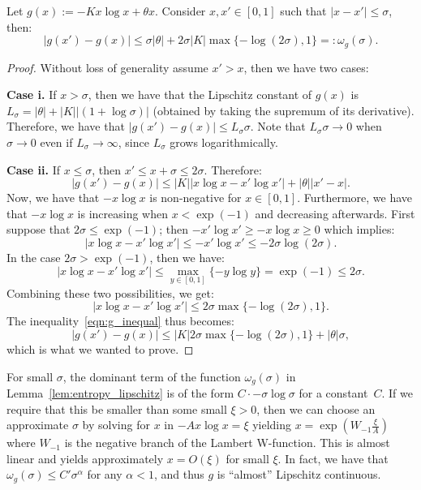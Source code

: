 \begin{lemma}
  \label{lem:entropy_lipschitz} Let $g(x) := -Kx\log x + \theta x$. Consider $x, x' \in [0,1]$ such that $|x-x'| \leq\sigma$, then:
  \begin{equation} \label{eqn:modulus_g}
  |g(x')-g(x)|\leq \sigma|\theta| + 2 \sigma |K| \max\{-\log(2\sigma),1\} =: \omega_g(\sigma).
  \end{equation}
\end{lemma}
\begin{proof}
	Without loss of generality assume $x'>x$, then we have two cases:

	\textbf{Case i.} 
	If $x>\sigma$, then we have that the Lipschitz constant of $g(x)$ is $L_{\sigma} = |\theta| + |K||(1+\log\sigma)|$ (obtained by taking 
	the supremum of its derivative). Therefore, we have that $|g(x')-g(x)|\leq L_{\sigma}\sigma$. Note that $L_\sigma\sigma\to 0$ when $\sigma\to 0$ even if
	$L_\sigma\to\infty$, since $L_\sigma$ grows logarithmically.

	\textbf{Case ii.}
	If $x\leq\sigma$, then $x'\leq x + \sigma \leq 2\sigma$. Therefore: 
	\begin{equation} \label{eqn:g_inequal}
	|g(x')-g(x)| \leq |K||x\log x-x'\log x'| + |\theta||x'-x|.
	\end{equation}
	Now, we have that $-x\log x$ is non-negative for $x\in [0,1]$. Furthermore, we have that 
	$-x\log x$ is increasing when $x<\exp(-1)$ and decreasing afterwards.
	First suppose that $2 \sigma \leq \exp(-1)$; then $-x'\log x' \geq -x\log x \geq 0$ which implies:
	$$
	|x\log x-x'\log x'| \leq -x' \log x' \leq - 2\sigma \log (2\sigma).
	$$
	In the case $2 \sigma > \exp(-1)$, then we have:
	$$ |x\log x-x'\log x'| \leq \max_{y \in [0,1]} \{-y \log y\} = \exp(-1) \leq 2 \sigma.
	$$
	Combining these two possibilities, we get:
	$$
	 |x\log x-x'\log x'| \leq 2\sigma \max\{- \log (2\sigma), 1\}.
	$$
	The inequality~\eqref{eqn:g_inequal} thus becomes:
	$$|g(x')-g(x)| \leq |K|2 \sigma  \max\{- \log (2\sigma), 1\} + |\theta|\sigma,$$
	which is what we wanted to prove.
\end{proof}
For small $\sigma$, the dominant term of the function $\omega_g(\sigma)$ in Lemma~\ref{lem:entropy_lipschitz} is of the 
form $C\cdot-\sigma\log\sigma$ for a constant~$C$. If we require that this be smaller than some small $\xi > 0$, then we can choose an approximate 
$\sigma$ by solving for $x$ in $-Ax\log x = \xi$ yielding $x = \exp( W_{-1} \frac{\xi}{A})$ where $W_{-1}$ is the negative 
branch of the Lambert W-function. This is almost linear and yields approximately $x = O(\xi)$ for small $\xi$. In fact, we have that $\omega_g(\sigma) \leq C' \sigma^\alpha$ for any $\alpha < 1$, and thus $g$ is ``almost'' Lipschitz continuous.

